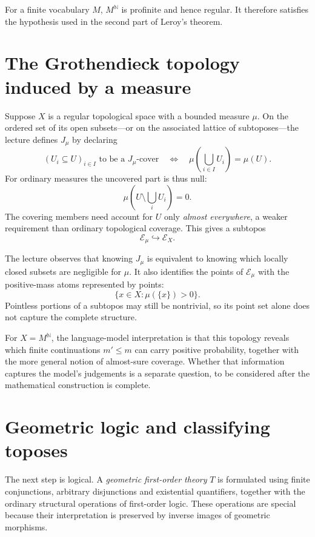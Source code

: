 For a finite vocabulary \(M\), \(M^{\mathbb N}\) is profinite and hence regular. It therefore satisfies the hypothesis used in the second part of Leroy's theorem.

\section{The Grothendieck topology induced by a measure}

Suppose \(X\) is a regular topological space with a bounded measure \(\mu\). On the ordered set of its open subsets---or on the associated lattice of subtoposes---the lecture defines \(J_\mu\) by declaring
\begin{equation}
 (U_i\subseteq U)_{i\in I}\text{ to be a }J_\mu\text{-cover}
 \quad\Longleftrightarrow\quad
 \mu\left(\bigcup_{i\in I}U_i\right)=\mu(U).
 \label{eq:N20261026-Jmu}
\end{equation}
For ordinary measures the uncovered part is thus null:
\[
 \mu\left(U\setminus\bigcup_iU_i\right)=0.
\]
The covering members need account for \(U\) only \emph{almost everywhere}, a weaker requirement than ordinary topological coverage. This gives a subtopos
\[
 \mathcal E_\mu\hookrightarrow\mathcal E_X.
\]

The lecture observes that knowing \(J_\mu\) is equivalent to knowing which locally closed subsets are negligible for \(\mu\). It also identifies the points of \(\mathcal E_\mu\) with the positive-mass atoms represented by points:
\[
 \bigl\{x\in X:\mu(\{x\})>0\bigr\}.
\]
Pointless portions of a subtopos may still be nontrivial, so its point set alone does not capture the complete structure.

For \(X=M^{\mathbb N}\), the language-model interpretation is that this topology reveals which finite continuations \(m'\leq m\) can carry positive probability, together with the more general notion of almost-sure coverage. Whether that information captures the model's judgements is a separate question, to be considered after the mathematical construction is complete.

\section{Geometric logic and classifying toposes}

The next step is logical. A \emph{geometric first-order theory} \(T\) is formulated using finite conjunctions, arbitrary disjunctions and existential quantifiers, together with the ordinary structural operations of first-order logic. These operations are special because their interpretation is preserved by inverse images of geometric morphisms.

